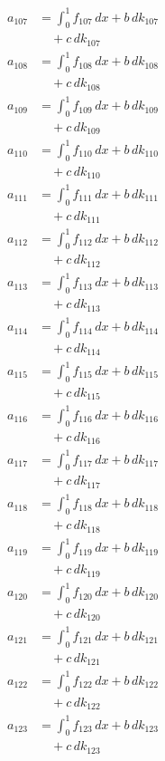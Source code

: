\documentclass{article}
\begin{document}
\begin{align}
a_{107} &= \int_0^1 f_{107}\,dx + b\,dk_{107} \\
&\quad + c\,dk_{107} \\
a_{108} &= \int_0^1 f_{108}\,dx + b\,dk_{108} \\
&\quad + c\,dk_{108} \\
a_{109} &= \int_0^1 f_{109}\,dx + b\,dk_{109} \\
&\quad + c\,dk_{109} \\
a_{110} &= \int_0^1 f_{110}\,dx + b\,dk_{110} \\
&\quad + c\,dk_{110} \\
a_{111} &= \int_0^1 f_{111}\,dx + b\,dk_{111} \\
&\quad + c\,dk_{111} \\
a_{112} &= \int_0^1 f_{112}\,dx + b\,dk_{112} \\
&\quad + c\,dk_{112} \\
a_{113} &= \int_0^1 f_{113}\,dx + b\,dk_{113} \\
&\quad + c\,dk_{113} \\
a_{114} &= \int_0^1 f_{114}\,dx + b\,dk_{114} \\
&\quad + c\,dk_{114} \\
a_{115} &= \int_0^1 f_{115}\,dx + b\,dk_{115} \\
&\quad + c\,dk_{115} \\
a_{116} &= \int_0^1 f_{116}\,dx + b\,dk_{116} \\
&\quad + c\,dk_{116} \\
a_{117} &= \int_0^1 f_{117}\,dx + b\,dk_{117} \\
&\quad + c\,dk_{117} \\
a_{118} &= \int_0^1 f_{118}\,dx + b\,dk_{118} \\
&\quad + c\,dk_{118} \\
a_{119} &= \int_0^1 f_{119}\,dx + b\,dk_{119} \\
&\quad + c\,dk_{119} \\
a_{120} &= \int_0^1 f_{120}\,dx + b\,dk_{120} \\
&\quad + c\,dk_{120} \\
a_{121} &= \int_0^1 f_{121}\,dx + b\,dk_{121} \\
&\quad + c\,dk_{121} \\
a_{122} &= \int_0^1 f_{122}\,dx + b\,dk_{122} \\
&\quad + c\,dk_{122} \\
a_{123} &= \int_0^1 f_{123}\,dx + b\,dk_{123} \\
&\quad + c\,dk_{123} \\

\end{align}
\end{document}

